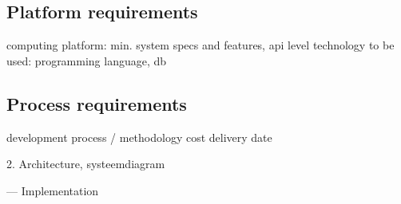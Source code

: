 \subsection{Platform requirements}

computing platform: min. system specs and features, api level
technology to be used: programming language, db

\subsection{Process requirements}

development process / methodology
cost
delivery date








2. Architecture, systeemdiagram




---
Implementation
